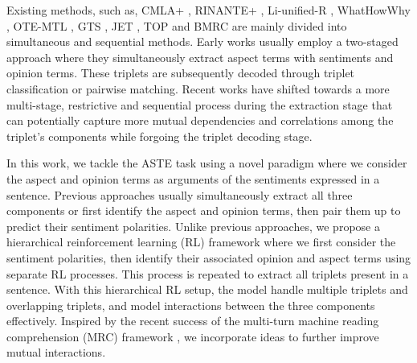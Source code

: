 \documentclass[sigconf]{acmart}
\begin{document}
\begin{table}[ht!]
\centering
\small
\caption{An Example of ASTE Triplets Present in a Sentence}
\label{tab:example}
\vspace{-1em}
\end{table}
Existing methods, such as, CMLA+ \cite{wang2017coupled}, RINANTE+ \cite{dai-song-2019-neural}, Li-unified-R \cite{Li2019Unified}, WhatHowWhy \cite{peng2020knowing}, OTE-MTL \cite{zhang2020multi}, GTS \cite{wu2020grid}, JET \cite{xu2020position}, TOP \cite{huang2021first} and BMRC \cite{chen2021bidirectional} are mainly divided into simultaneous and sequential methods. Early works \cite{wang2017coupled, dai-song-2019-neural, Li2019Unified, peng2020knowing, zhang2020multi, wu2020grid} usually employ a two-staged approach where they simultaneously extract aspect terms with sentiments and opinion terms. These triplets are subsequently decoded through triplet classification or pairwise matching. Recent works \cite{huang2021first, chen2021bidirectional} have shifted towards a more multi-stage, restrictive and sequential process during the extraction stage that can potentially capture more mutual dependencies and correlations among the triplet's components while forgoing the triplet decoding stage.

In this work, we tackle the ASTE task using a novel paradigm \textbf{\mymodel{}} where we consider the aspect and opinion terms as arguments of the sentiments expressed in a sentence. Previous approaches usually simultaneously extract all three components or first identify the aspect and opinion terms, then pair them up to predict their sentiment polarities. Unlike previous approaches, we propose a hierarchical reinforcement learning (RL) framework \cite{takanobu2019hierarchical, duan2020actionet} where we first consider the sentiment polarities, then identify their associated opinion and aspect terms using separate RL processes. This process is repeated to extract all triplets present in a sentence. With this hierarchical RL setup, the model handle multiple triplets and overlapping triplets, and model interactions between the three components effectively. Inspired by the recent success of the multi-turn machine reading comprehension (MRC) framework \cite{li-etal-2019-entity, chen2021bidirectional}, we incorporate ideas to further improve mutual interactions.
\end{document}
